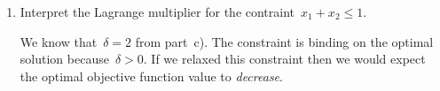 \begin{enumerate}
\begin{enumerate}
		\item
		Interpret the Lagrange multiplier for the contraint~$x_1+x_2\le1$.
		\begin{solution}
			We know that~$\delta=2$ from part~c).
			The constraint is binding on the optimal solution because~$\delta>0$.
			If we relaxed this constraint then we would expect the optimal objective function value to \emph{decrease}.
		\end{solution}

	\end{enumerate}

\end{enumerate}

